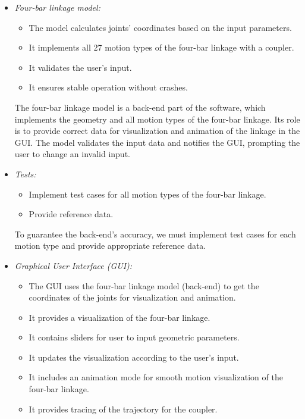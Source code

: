 \documentclass{article}
\begin{document}
\begin{itemize}
	\item \textit{Four-bar linkage model:}
	\begin{itemize}
		\item The model calculates joints' coordinates based on the input parameters.
		\item It implements all 27 motion types of the four-bar linkage with a coupler.
		\item It validates the user's input.
		\item It ensures stable operation without crashes.
	\end{itemize}
	
	The four-bar linkage model is a back-end part of the software, which implements the geometry and all motion types of the four-bar linkage. Its role is to provide correct data for visualization and animation of the linkage in the GUI. The model validates the input data and notifies the GUI, prompting the user to change an invalid input.
	
	\item \textit{Tests:}
	\begin{itemize}
		\item Implement test cases for all motion types of the four-bar linkage.
		\item Provide reference data.
	\end{itemize}
	
	To guarantee the back-end's accuracy, we must implement test cases for each motion type and provide appropriate reference data.
	
	\item \textit{Graphical User Interface (GUI):}
	\begin{itemize}
		\item The GUI uses the four-bar linkage model (back-end) to get the coordinates of the joints for visualization and animation.
		\item It provides a visualization of the four-bar linkage.
		\item It contains sliders for user to input geometric parameters.
		\item It updates the visualization according to the user's input.
		\item It includes an animation mode for smooth motion visualization of the four-bar linkage.
		\item It provides tracing of the trajectory for the coupler.
	\end{itemize}
	

\end{itemize}
\end{document}
